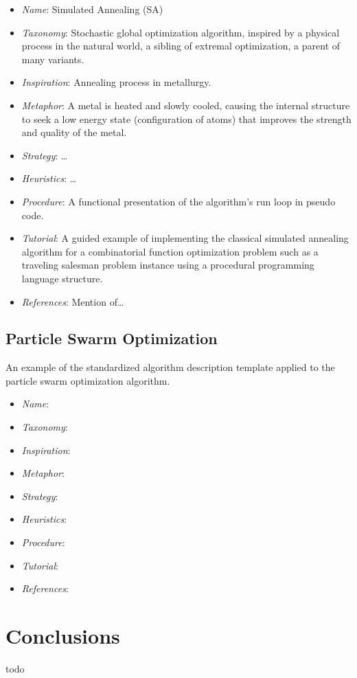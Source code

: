 \documentclass[a4paper, 11pt]{article}
\begin{document}
\begin{itemize}
	\item \emph{Name}: Simulated Annealing (SA)
	\item \emph{Taxonomy}: Stochastic global optimization algorithm, inspired by a physical process in the natural world, a sibling of extremal optimization, a parent of many variants. 
	\item \emph{Inspiration}: Annealing process in metallurgy. 
	\item \emph{Metaphor}: A metal is heated and slowly cooled, causing the internal structure to seek a low energy state (configuration of atoms) that improves the strength and quality of the metal. 
	\item \emph{Strategy}: \ldots
	\item \emph{Heuristics}: \ldots
	\item \emph{Procedure}: A functional presentation of the algorithm's run loop in pseudo code.
	\item \emph{Tutorial}: A guided example of implementing the classical simulated annealing algorithm for a combinatorial function optimization problem such as a traveling salesman problem instance using a procedural programming language structure.
	\item \emph{References}: Mention of\ldots
\end{itemize}

\subsection{Particle Swarm Optimization}
An example of the standardized algorithm description template applied to the particle swarm optimization algorithm.

\begin{itemize}
	\item \emph{Name}: 
	\item \emph{Taxonomy}: 
	\item \emph{Inspiration}: 
	\item \emph{Metaphor}: 
	\item \emph{Strategy}: 
	\item \emph{Heuristics}: 
	\item \emph{Procedure}: 
	\item \emph{Tutorial}: 
	\item \emph{References}: 
\end{itemize}

\section{Conclusions}
\label{sec:conclusions}
todo



\end{document}
